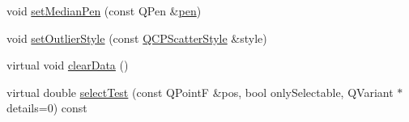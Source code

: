\begin{DoxyCompactItemize}
\item 
void \hyperlink{classQCPStatisticalBox_a7260ac55b669f5d0a74f16d5ca84c52c}{set\+Median\+Pen} (const Q\+Pen \&\hyperlink{classQCPAbstractPlottable_a41d060007cc6b3037c9c04d22d0c0398}{pen})
\item 
void \hyperlink{classQCPStatisticalBox_ad5241943422eb8e58360a97e99ad6aa7}{set\+Outlier\+Style} (const \hyperlink{classQCPScatterStyle}{Q\+C\+P\+Scatter\+Style} \&style)
\item 
virtual void \hyperlink{classQCPStatisticalBox_a19112994449df0c20287858436cc68e3}{clear\+Data} ()
\item 
virtual double \hyperlink{classQCPStatisticalBox_a7d3ac843dc48a085740fdfc4319a89cc}{select\+Test} (const Q\+PointF \&pos, bool only\+Selectable, Q\+Variant $\ast$details=0) const 
\end{DoxyCompactItemize}

